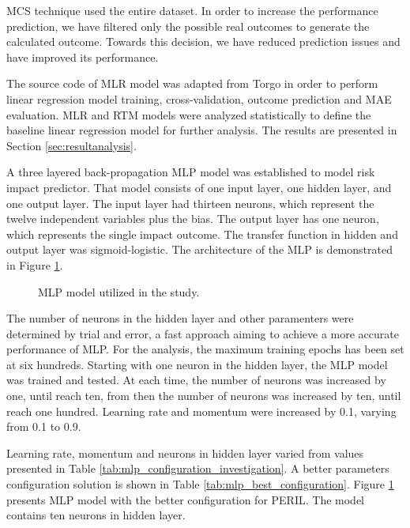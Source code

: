 \documentclass[a4paper,twoside]{article}
\begin{document}
MCS technique used the entire dataset. In order to increase the performance prediction, we have filtered only the possible real outcomes to generate the calculated outcome. Towards this decision, we have reduced prediction issues and have improved its performance.

The source code of MLR model was adapted from Torgo \cite{torgo2003data} in order to perform linear regression model training, cross-validation, outcome prediction and MAE evaluation. MLR and RTM models were analyzed statistically to define the baseline linear regression model for further analysis. The results are presented in Section \ref{sec:resultanalysis}.

A three layered back-propagation MLP model was established to model risk impact predictor. That model consists of one input layer, one hidden layer, and one output layer. The input layer had thirteen neurons, which represent the twelve independent variables plus the bias. The output layer has one neuron, which represents the single impact outcome. The transfer function in hidden and output layer was sigmoid-logistic. The architecture of the MLP is demonstrated in Figure \ref{fig:mlpmodelstudy}.

\begin{figure}[!h]
  \vspace{-0.2cm}
  \centering
  \def \svgwidth{0.85\columnwidth}
  
  \caption{MLP model utilized in the study.}
  \label{fig:mlpmodelstudy}
\end{figure} 

The number of neurons in the hidden layer and other paramenters were determined by trial and error, a fast approach aiming to achieve a more accurate performance of MLP. For the analysis, the maximum training epochs has been set at six hundreds. Starting with one neuron in the hidden layer, the MLP model was trained and tested. At each time, the number of neurons was increased by one, until reach ten, from then the number of neurons was increased by ten, until reach one hundred. Learning rate and momentum were increased by 0.1, varying from 0.1 to 0.9. 

Learning rate, momentum and neurons in hidden layer varied from values presented in Table \ref{tab:mlp_configuration_investigation}. A better parameters configuration solution is shown in Table \ref{tab:mlp_best_configuration}. Figure \ref{fig:mlpmodelstudy} presents MLP model with the better configuration for PERIL. The model contains ten neurons in hidden layer.
\end{document}
